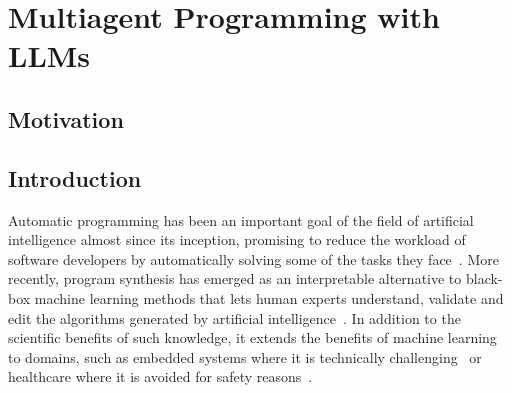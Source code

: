 \chapter{Multiagent Programming with LLMs}
\label{ch:seidr}


\newcommand{\method}[0]{SEIDR}
\newcommand{\synthesize}[0]{SYNTHESIZE}
\newcommand{\execute}[0]{EXECUTE}
\newcommand{\instruct}[0]{INSTRUCT}
\newcommand{\instructs}[0]{INSTRUCT$^{\text{static}}$}
\newcommand{\instructllm}[0]{INSTRUCT$^{\text{LLM}}$}
\newcommand{\debug}[0]{DEBUG}
\newcommand{\rank}[0]{RANK}
\newcommand{\beamwidth}[0]{W}
\newcommand{\treearity}[0]{N}
\newcommand{\treearitydebug}[0]{N_\text{debug}}
\newcommand{\treearityexplain}[0]{N_\text{explain}}
\newcommand{\treearitydraft}[0]{N_\text{synth}}
\newcommand{\expectedoutput}[0]{O}
\newcommand{\synthmodel}[0]{$p_\text{synth}(\text{code}, \text{descr})$}
\newcommand{\debugmodel}[0]{$p_\text{debug}(\text{code}, \text{descr})$}
\newcommand{\textmodel}[0]{$p_\text{explain}(\text{code}, \text{descr})$}
\newcommand{\synthmodelnoargs}[0]{$p_\text{synth}$}
\newcommand{\debugmodelnoargs}[0]{$p_\text{debug}$}
\newcommand{\textmodelnoargs}[0]{$p_\text{explain}$}

\newcommand{\gpt}[0]{GPT-3.5}
\newcommand{\llama}[0]{Llama~3}
\newcommand{\cpp}[0]{C++}
\newcommand{\py}[0]{Python}
\newcommand{\smalltt}[1]{\texttt{\fontsize{8.5}{9}\selectfont#1}}


\section{Motivation}


\section{Introduction}
\label{sec:seidr-intro}

Automatic programming has been an important goal of the field of artificial intelligence almost since its inception, promising to reduce the workload of software developers by automatically solving some of the tasks they face~\cite{manna1971:automatic}.
More recently, program synthesis has emerged as an interpretable alternative to black-box machine learning methods that lets human experts understand, validate and edit the algorithms generated by artificial intelligence~\cite{bastani2022:interpretable}.
In addition to the scientific benefits of such knowledge, it extends the benefits of machine learning to domains, such as embedded systems where it is technically challenging~\cite{dhar2021:survey} or healthcare where it is avoided for safety reasons~\cite{connolly2023:systematic,jia2022:role}.

